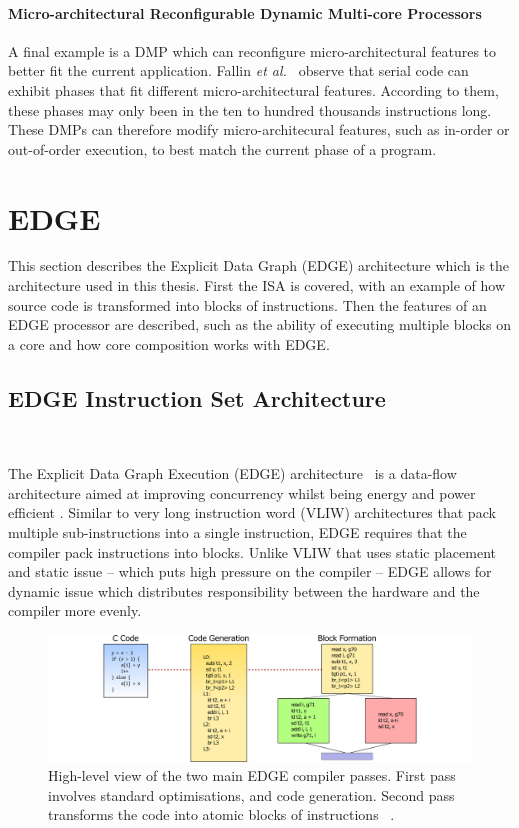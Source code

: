 \paragraph*{Micro-architectural Reconfigurable Dynamic Multi-core Processors}
A final example is a DMP which can reconfigure micro-architectural features to better fit the current application.
Fallin {\it et al.~}\cite{fallinhetblock2014} observe that serial code can exhibit phases that fit different micro-architectural features.
According to them, these phases may only been in the ten to hundred thousands instructions long.
These DMPs can therefore modify micro-architecural features, such as in-order or out-of-order execution, to best match the current phase of a program.

\section{EDGE}\label{chp:bg:sec:edge}

This section describes the Explicit Data Graph (EDGE) architecture which is the architecture used in this thesis.
First the ISA is covered, with an example of how source code is transformed into blocks of instructions.
Then the features of an EDGE processor are described, such as the ability of executing multiple blocks on a core and how core composition works with EDGE.

\subsection{EDGE Instruction Set Architecture}~\label{sec:edge_isa}

The Explicit Data Graph Execution (EDGE) architecture~\cite{burger04edge} is a data-flow architecture aimed at improving concurrency whilst being energy and power efficient \cite{smith2006edge,burger04edge}.
Similar to very long instruction word (VLIW) architectures that pack multiple sub-instructions into a single instruction, EDGE requires that the compiler pack instructions into blocks.
Unlike VLIW that uses static placement and static issue -- which puts high pressure on the compiler -- EDGE allows for dynamic issue which distributes responsibility between the hardware and the compiler more evenly.

\begin{figure}[t]
    \centering
    \includegraphics[width=1\textwidth]{background/graphics/EDGE_4.pdf}
    \caption{High-level view of the two main EDGE compiler passes. First pass involves standard optimisations, and code generation. Second pass transforms the code into atomic blocks of instructions ~\cite{smith2006edge}.}
    \label{fig:EdgeHigh}
\end{figure}
